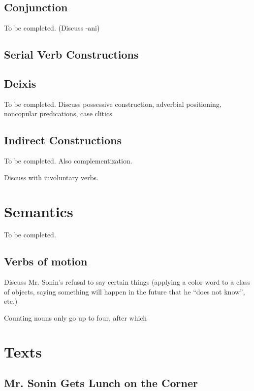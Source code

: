 \documentclass[pdftex,12pt,letterpaper]{article}
\let\ipa\textipa
\begin{document}
 \subsection{Conjunction}

 To be completed. (Discuss -ani)
 
 \subsection{Serial Verb Constructions}

 \subsection{Deixis}

 To be completed. Discuss possessive construction, adverbial positioning, noncopular predications, case clitics.

 \subsection{Indirect Constructions}

 To be completed. Also complementization.

 Discuss \emph{\ipa{\textltailn e}} with involuntary verbs.

 \section{Semantics}

 To be completed.

 \subsection{Verbs of motion}

 Discuss Mr. Sonin's refusal to say certain things (applying a color word to a class of objects, saying something will happen in the future that he ``does not know'', etc.)

 Counting nouns only go up to four, after which 


 \pagebreak
 \section{Texts}

 \subsection{Mr. Sonin Gets Lunch on the Corner}
\end{document}
